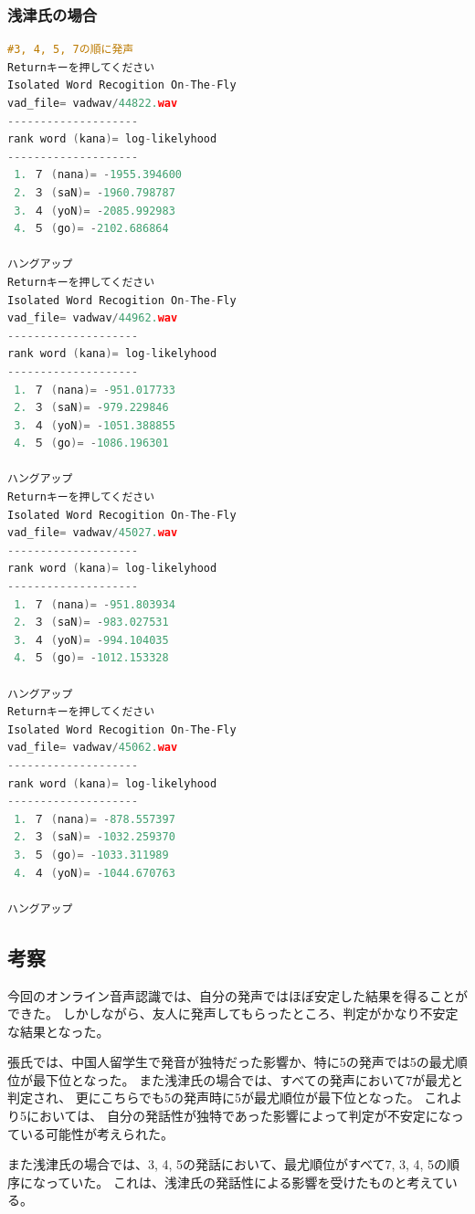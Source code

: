\documentclass[11pt,a4paper, uplatex]{jsarticle}
\begin{document}
\subsubsection{浅津氏の場合}
\begin{lstlisting}[language=c, caption=\texttt{recog}実行結果(浅津氏)]
#3, 4, 5, 7の順に発声
Returnキーを押してください
Isolated Word Recogition On-The-Fly
vad_file= vadwav/44822.wav
--------------------
rank word (kana)= log-likelyhood
--------------------
 1. ７ (nana)= -1955.394600
 2. ３ (saN)= -1960.798787
 3. ４ (yoN)= -2085.992983
 4. ５ (go)= -2102.686864

ハングアップ
Returnキーを押してください
Isolated Word Recogition On-The-Fly
vad_file= vadwav/44962.wav
--------------------
rank word (kana)= log-likelyhood
--------------------
 1. ７ (nana)= -951.017733
 2. ３ (saN)= -979.229846
 3. ４ (yoN)= -1051.388855
 4. ５ (go)= -1086.196301

ハングアップ
Returnキーを押してください
Isolated Word Recogition On-The-Fly
vad_file= vadwav/45027.wav
--------------------
rank word (kana)= log-likelyhood
--------------------
 1. ７ (nana)= -951.803934
 2. ３ (saN)= -983.027531
 3. ４ (yoN)= -994.104035
 4. ５ (go)= -1012.153328

ハングアップ
Returnキーを押してください
Isolated Word Recogition On-The-Fly
vad_file= vadwav/45062.wav
--------------------
rank word (kana)= log-likelyhood
--------------------
 1. ７ (nana)= -878.557397
 2. ３ (saN)= -1032.259370
 3. ５ (go)= -1033.311989
 4. ４ (yoN)= -1044.670763

ハングアップ
\end{lstlisting}

\subsection{考察}
今回のオンライン音声認識では、自分の発声ではほぼ安定した結果を得ることができた。
しかしながら、友人に発声してもらったところ、判定がかなり不安定な結果となった。

張氏では、中国人留学生で発音が独特だった影響か、特に5の発声では5の最尤順位が最下位となった。
また浅津氏の場合では、すべての発声において7が最尤と判定され、
更にこちらでも5の発声時に5が最尤順位が最下位となった。
これより5においては、
自分の発話性が独特であった影響によって判定が不安定になっている可能性が考えられた。

また浅津氏の場合では、3, 4, 5の発話において、最尤順位がすべて7, 3, 4, 5の順序になっていた。
これは、浅津氏の発話性による影響を受けたものと考えている。
\end{document}
